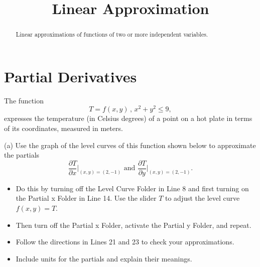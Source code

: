 \documentclass{ximera}
\title{Linear Approximation}
\begin{document}
\begin{abstract}
Linear approximations of functions of two or more independent variables.
\end{abstract}
\maketitle


\section{Partial Derivatives}

\begin{example}  \label{Edgtr543}

The function
\[
    T = f(x,y) \, , \, x^2 + y^2 \leq 9 ,
\]
expresses the temperature (in Celsius degrees) of a point on a hot plate in terms of its coordinates, measured in meters. 

(a) Use the graph of the level curves of this function shown below to approximate the partials 
\[
    \frac{\partial T}{\partial x}\Big|_{(x,y)=(2,-1)} \text{ and } \frac{\partial T}{\partial y}\Big|_{(x,y)=(2,-1)} .
\]

\begin{itemize}
\item{Do this by turning off the Level Curve Folder in Line 8 and first turning on the Partial x Folder in Line 14. Use the slider $T$ to adjust the level curve $f(x,y)=T$.} 

\item{Then turn off the Partial x Folder, activate the Partial y Folder, and repeat.}

\item{Follow the directions in Lines 21 and 23 to check your approximations.}

\item{Include units for the partials and explain their meanings.}

\end{itemize}

 
\begin{onlineOnly}
    \begin{center}
\end{center}
\end{onlineOnly}


\end{example}
\end{document}
